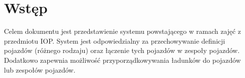 \chapter{Wstęp}

Celem dokumentu jest przedstawienie systemu powstającego w ramach zajęć z przedmiotu IOP.
System jest odpowiedzialny za przechowywanie definicji pojazdów (różnego rodzaju) oraz łączenie tych pojazdów w zespoły
pojazdów. Dodatkowo zapewnia możliwość przyporządkowywania ładunków do pojazdów lub zespołów pojazdów.
